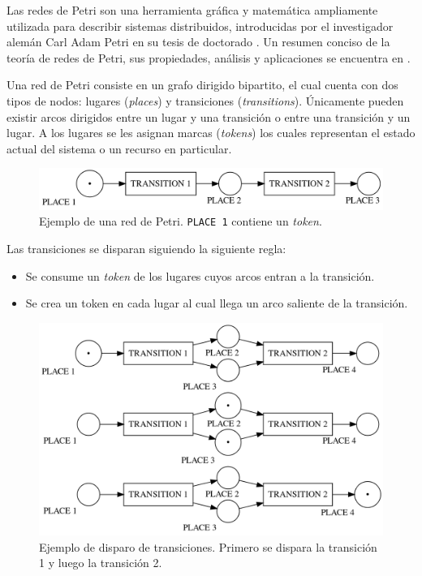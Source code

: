 \documentclass[12pt]{article}
\begin{document}
Las redes de Petri son una herramienta gráfica y matemática ampliamente utilizada para describir sistemas distribuidos,
introducidas por el investigador alemán Carl Adam Petri en su tesis de doctorado \cite{petri1962}.
Un resumen conciso de la teoría de redes de Petri, sus propiedades, análisis y aplicaciones se encuentra en \cite{murata1989}.

Una red de Petri consiste en un grafo dirigido bipartito, el cual cuenta con dos tipos de nodos: lugares (\textit{places}) y transiciones (\textit{transitions}).
Únicamente pueden existir arcos dirigidos entre un lugar y una transición o entre una transición y un lugar.
A los lugares se les asignan marcas (\textit{tokens}) los cuales representan el estado actual del sistema o un recurso en particular.

\begin{figure}[H]
    \centering
    \includegraphics[scale=0.25]{petri-net-example.png}
    \caption{Ejemplo de una red de Petri. \texttt{PLACE 1} contiene un \textit{token}.}
\end{figure}

Las transiciones se disparan siguiendo la siguiente regla:
\begin{itemize}
    \item Se consume un \textit{token} de los lugares cuyos arcos entran a la transición.
    \item Se crea un token en cada lugar al cual llega un arco saliente de la transición.
\end{itemize}

\begin{figure}[H]
    \centering
    \includegraphics[scale=0.25]{petri-net-transition-firing-example.png}
    \caption{Ejemplo de disparo de transiciones. Primero se dispara la transición 1 y luego la transición 2.}
\end{figure}
\end{document}
